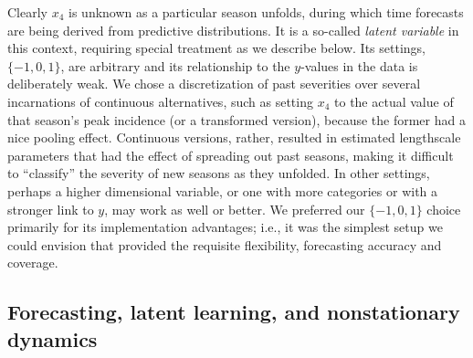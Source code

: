 \documentclass[12pt]{article}
\begin{document}
Clearly $x_4$ is unknown as a particular season unfolds, during which time
forecasts are being derived from predictive distributions.  It is a so-called
{\em latent variable} in this context, requiring special treatment as we
describe below.  Its settings, $\{-1,0,1\}$, are arbitrary and its
relationship to the $y$-values in the data is deliberately weak.  We chose a
discretization of past severities over several incarnations of continuous
alternatives, such as setting $x_4$ to the actual value of that season's
peak incidence (or a transformed version), because the former had a nice
pooling effect.  Continuous versions, rather, resulted in estimated
lengthscale parameters that had the effect of spreading out past seasons,
making it difficult to ``classify'' the severity of new seasons as they
unfolded. In other settings, perhaps a higher dimensional variable, or one with
more categories or with a stronger link to $y$, may work as well or better. We
preferred our $\{-1,0,1\}$ choice primarily for its implementation advantages;
i.e., it was the simplest setup we could envision that provided the requisite
flexibility, forecasting accuracy and coverage.

\subsection{Forecasting, latent learning, and nonstationary dynamics}
\label{sec:latent}
\end{document}
